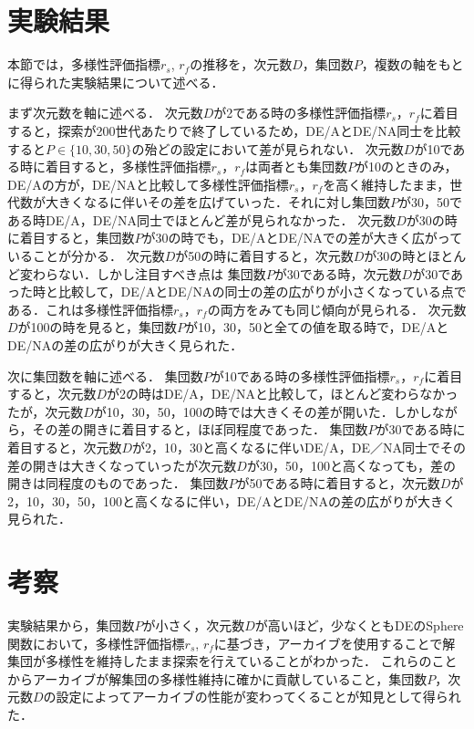 \documentclass[a4paper,11pt,oneside,openany]{jsbook}
\begin{document}
\section{実験結果}
本節では，多様性評価指標$r_s$, $r_f$の推移を，次元数$D$，集団数$P$，複数の軸をもとに得られた実験結果について述べる．

まず次元数を軸に述べる．
次元数$D$が2である時の多様性評価指標$r_s$，$r_f$に着目すると，探索が200世代あたりで終了しているため，DE/AとDE/NA同士を比較すると$P\in\{10,30,50\}$の殆どの設定において差が見られない．
次元数$D$が10である時に着目すると，多様性評価指標$r_s$，$r_f$は両者とも集団数$P$が10のときのみ，DE/Aの方が，DE/NAと比較して多様性評価指標$r_s$，$r_f$を高く維持したまま，世代数が大きくなるに伴いその差を広げていった．それに対し集団数$P$が30，50である時DE/A，DE/NA同士でほとんど差が見られなかった．
次元数$D$が30の時に着目すると，集団数$P$が30の時でも，DE/AとDE/NAでの差が大きく広がっていることが分かる．
次元数$D$が50の時に着目すると，次元数$D$が30の時とほとんど変わらない．しかし注目すべき点は
集団数$P$が30である時，次元数$D$が30であった時と比較して，DE/AとDE/NAの同士の差の広がりが小さくなっている点である．これは多様性評価指標$r_s$，$r_f$の両方をみても同じ傾向が見られる．
次元数$D$が100の時を見ると，集団数$P$が10，30，50と全ての値を取る時で，DE/AとDE/NAの差の広がりが大きく見られた．

次に集団数を軸に述べる．
集団数$P$が10である時の多様性評価指標$r_s$，$r_f$に着目すると，次元数$D$が2の時はDE/A，DE/NAと比較して，ほとんど変わらなかったが，次元数$D$が10，30，50，100の時では大きくその差が開いた．しかしながら，その差の開きに着目すると，ほぼ同程度であった．
集団数$P$が30である時に着目すると，次元数$D$が2，10，30と高くなるに伴いDE/A，DE／NA同士でその差の開きは大きくなっていったが次元数$D$が30，50，100と高くなっても，差の開きは同程度のものであった．
集団数$P$が50である時に着目すると，次元数$D$が2，10，30，50，100と高くなるに伴い，DE/AとDE/NAの差の広がりが大きく見られた．


\section{考察}
実験結果から，集団数$P$が小さく，次元数$D$が高いほど，少なくともDEのSphere関数において，多様性評価指標$r_s$, $r_f$に基づき，アーカイブを使用することで解集団が多様性を維持したまま探索を行えていることがわかった．
これらのことからアーカイブが解集団の多様性維持に確かに貢献していること，集団数$P$，次元数$D$の設定によってアーカイブの性能が変わってくることが知見として得られた．
\end{document}

